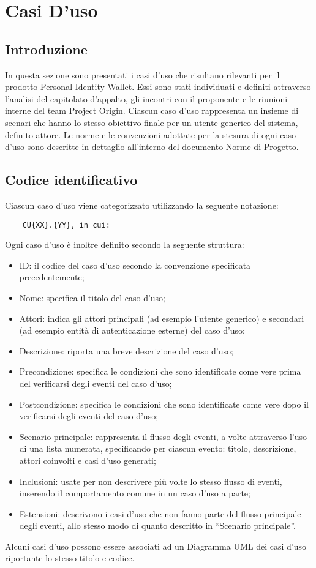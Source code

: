 \section{Casi D'uso}
\subsection{Introduzione}
In questa sezione sono presentati i casi d'uso che risultano rilevanti per il prodotto Personal Identity Wallet. 
Essi sono stati individuati e definiti attraverso l'analisi del capitolato d'appalto, gli incontri con il proponente e le riunioni interne del team Project Origin.
 Ciascun caso d'uso rappresenta un insieme di scenari che hanno lo stesso obiettivo finale per un utente generico del sistema, definito attore.
 Le norme e le convenzioni adottate per la stesura di ogni caso d'uso sono descritte in dettaglio all'interno del documento Norme di Progetto.
 \subsection{Codice identificativo}
Ciascun caso d'uso viene categorizzato utilizzando la seguente notazione:\\ 
\begin{center}\begin{verbatim}
    CU{XX}.{YY}, in cui:
\end{verbatim}\end{center}
Ogni caso d’uso è inoltre definito secondo la seguente struttura:
\begin{itemize}
    \item ID: il codice del caso d’uso secondo la convenzione specificata precedentemente;
    \item Nome:  specifica il titolo del caso d’uso;
    \item Attori:  indica gli attori principali (ad esempio l’utente generico) e secondari (ad esempio entità di autenticazione esterne) del caso d’uso;
    \item Descrizione:  riporta una breve descrizione del caso d’uso;
    \item Precondizione:  specifica le condizioni che sono identificate come vere prima del verificarsi degli eventi del caso d’uso;
    \item Postcondizione:  specifica  le  condizioni  che  sono  identificate  come  vere  dopo  il verificarsi degli eventi del caso d’uso;
    \item Scenario  principale:  rappresenta  il  flusso  degli  eventi,  a  volte  attraverso  l'uso di  una  lista  numerata,  specificando  per  ciascun  evento:  titolo,  descrizione,  attori coinvolti e casi d’uso generati;
    \item Inclusioni:  usate per non descrivere più volte lo stesso flusso di eventi, inserendo il comportamento comune in un caso d’uso a parte;
    \item   Estensioni:  descrivono i casi d’uso che non fanno parte del flusso principale degli eventi, allo stesso modo di quanto descritto in “Scenario principale”.
\end{itemize}
Alcuni  casi  d’uso  possono  essere  associati  ad  un Diagramma UML  dei  casi  d'uso riportante lo stesso titolo e codice.
